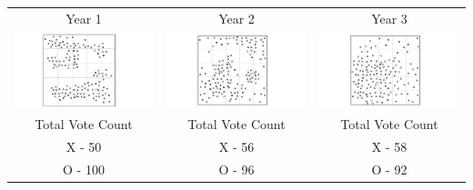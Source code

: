 \begin{tabular}{c c c }

Year 1 & Year 2 & Year 3 \\
 \includegraphics[width=2in]{assets/Gerrymandering/Gerry5x5-150-1.pdf} &  \includegraphics[width=2in]{assets/Gerrymandering/Gerry5x5-150-2.pdf} &  \includegraphics[width=2in]{assets/Gerrymandering/Gerry5x5-150-3.pdf}\\
 Total Vote Count &  Total Vote Count &  Total Vote Count\\
 X -  50& X - 56 & X  - 58\\
 O - 100 & O - 96 & O - 92
 \end{tabular}